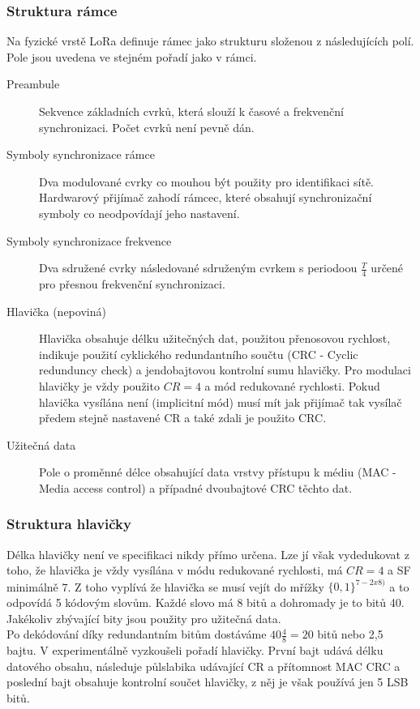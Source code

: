 \documentclass{ctuthesis}
\begin{document}
\subsubsection{Struktura rámce}
Na fyzické vrstě LoRa definuje rámec jako strukturu složenou z následujících polí. Pole jsou uvedena ve stejném pořadí jako v rámci.
\begin{description}
\item[Preambule]
Sekvence základních cvrků, která slouží k časové a frekvenční synchronizaci. Počet cvrků není pevně dán.
\item[Symboly synchronizace rámce]
Dva modulované cvrky co mouhou být použity pro identifikaci sítě. Hardwarový přijímač zahodí rámcec, které obsahují synchronizační symboly co neodpovídají jeho nastavení.
\item[Symboly synchronizace frekvence]
Dva sdružené cvrky následované sdruženým cvrkem s periodoou $\frac{T}{4}$ určené pro přesnou frekvenční synchronizaci.
\item[Hlavička (nepoviná)]
Hlavička obsahuje délku užitečných dat, použitou přenosovou rychlost, indikuje použití cyklického redundantního součtu (CRC - Cyclic redunduncy check) a jendobajtovou kontrolní sumu hlavičky. Pro modulaci hlavičky je vždy použito $CR =4$ a mód redukované rychlosti. Pokud hlavička vysílána není (implicitní mód) musí mít jak přijímač tak vysílač předem stejně nastavené CR a také zdali je použito CRC.
\item[Užitečná data]
Pole o proměnné délce obsahující data vrstvy přístupu k médiu (MAC - Media access control) a případné dvoubajtové CRC těchto dat.
\end{description}
\subsubsection{Struktura hlavičky}
Délka hlavičky není ve specifikaci nikdy přímo určena. Lze jí však vydedukovat z toho, že hlavička je vždy vysílána v módu redukované rychlosti, má $CR =4$ a SF minimálně 7. Z toho vyplívá že hlavička se musí vejít do mřížky $\{0,1\}^{7-2 x 8)}$ a to odpovídá 5 kódovým slovům. Každé slovo má 8 bitů a dohromady je to bitů 40. Jakékoliv zbývající bity jsou použity pro užitečná data. \\
Po dekódování díky redundantním bitům dostáváme $40\frac{4}{8} = 20$ bitů nebo 2,5 bajtu. V \cite{gr-lora2018} experimentálně vyzkoušeli pořadí hlavičky. První bajt udává délku datového obsahu, následuje půlslabika  udávající CR a přítomnost MAC CRC a poslední bajt obsahuje kontrolní součet hlavičky, z něj je však používá jen 5 LSB bitů.
\end{document}
